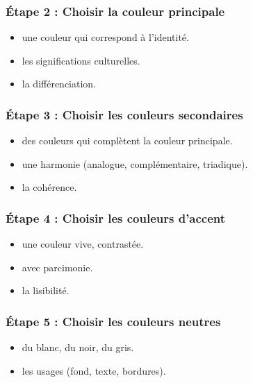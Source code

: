 \subsubsection{Étape 2 : Choisir la couleur principale}

\begin{itemize}
    \item {} une couleur qui correspond à l'identité.
    \item {} les significations culturelles.
    \item {} la différenciation.
\end{itemize}

\subsubsection{Étape 3 : Choisir les couleurs secondaires}

\begin{itemize}
    \item {} des couleurs qui complètent la couleur principale.
    \item {} une harmonie (analogue, complémentaire, triadique).
    \item {} la cohérence.
\end{itemize}

\subsubsection{Étape 4 : Choisir les couleurs d'accent}

\begin{itemize}
    \item {} une couleur vive, contrastée.
    \item {} avec parcimonie.
    \item {} la lisibilité.
\end{itemize}

\subsubsection{Étape 5 : Choisir les couleurs neutres}

\begin{itemize}
    \item {} du blanc, du noir, du gris.
    \item {} les usages (fond, texte, bordures).
\end{itemize}

